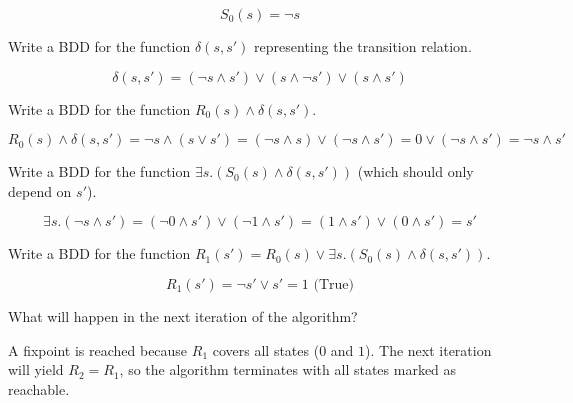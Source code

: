 \documentclass[11pt]{article}
\begin{document}
\begin{qunlist}
\begin{qparts}
\begin{answer}
      \begin{equation}
        S_0(s)=\neg s
      \end{equation}

    \end{answer}

  \item
    Write a BDD for the function $\delta(s, s')$ representing the transition relation.

    \begin{answer}
      \begin{equation}
        \delta(s, s') = (\neg s \land s') \lor (s \land \neg s') \lor (s \land s')
      \end{equation}
    \end{answer}

  \item
    Write a BDD for the function $R_0(s) \land \delta(s, s')$.

    \begin{answer}
      \begin{equation}
        R_0(s) \land \delta(s, s') = \neg s \land (s \lor s') = (\neg s \land s) \lor (\neg s \land s') = 0 \lor (\neg s \land s') = \neg s \land s'
      \end{equation}
    \end{answer}

  \item
    Write a BDD for the function $\exists s. (S_0(s) \land \delta(s, s'))$ (which should only depend on $s'$).

    \begin{answer}
      \begin{equation}
        \exists s. (\neg s \land s') = (\neg 0 \land s') \lor (\neg 1 \land s') = (1 \land s') \lor (0 \land s') = s'
      \end{equation}
    \end{answer}

  \item
    Write a BDD for the function $R_1(s') = R_0(s) \lor \exists s. (S_0(s) \land \delta(s, s'))$.

    \begin{answer}
      \begin{equation}
        R_1(s') = \neg s' \lor s' = 1 \text{ (True)}
      \end{equation}

    \end{answer}

  \item
    What will happen in the next iteration of the algorithm?

    \begin{answer}
      A fixpoint is reached because $R_1$ covers all states ($0$ and $1$). The next iteration will yield $R_2 = R_1$, so the algorithm terminates with all states marked as reachable.
    \end{answer}
  \end{qparts}

\end{qunlist}
\end{document}
